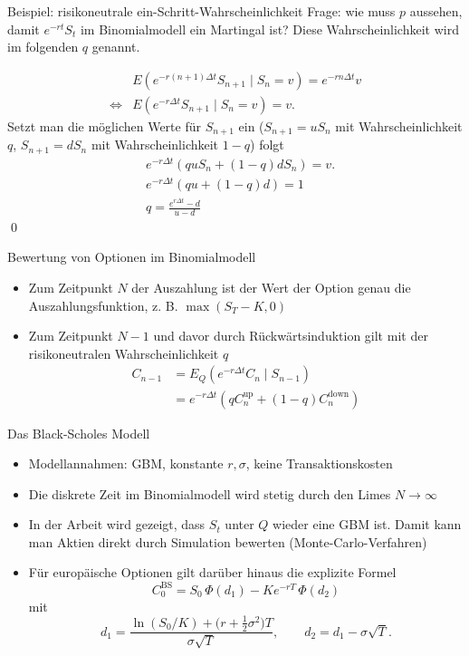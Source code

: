 \documentclass{beamer}
\begin{document}
\begin{frame}{Beispiel: risikoneutrale ein-Schritt-Wahrscheinlichkeit}
Frage: wie muss $p$ aussehen, damit $e^{-r t} S_t$ im Binomialmodell ein Martingal ist? Diese Wahrscheinlichkeit wird im folgenden $q$ genannt.

$$
\begin{aligned}
&E(e^{-r (n+1) \Delta t} S_{n+1} \mid S_n = v) = e^{-r n \Delta t} v
\\ 
\iff &E(e^{-r \Delta t} S_{n+1} \mid S_n=v) = v.
\end{aligned}
$$
Setzt man die möglichen Werte für $S_{n+1}$ ein ($S_{n+1} = u S_n$ mit Wahrscheinlichkeit $q$, $S_{n+1} = d S_n$ mit Wahrscheinlichkeit $1-q$) folgt
$$
\begin{aligned}
&e^{-r \Delta t} \left( q u S_n + (1-q) d S_n \right) = v.
\\
&e^{-r \Delta t} \left( q u + (1-q) d \right) = 1
\\
&q = \frac{e^{r \Delta t} - d}{u - d}
\end{aligned}
$$ \qed
\end{frame}

\begin{frame}{Bewertung von Optionen im Binomialmodell}
  \begin{itemize}
      \item Zum Zeitpunkt $N$ der Auszahlung ist der Wert der Option genau die Auszahlungsfunktion, z. B. $\max(S_T - K, 0)$
      \item Zum Zeitpunkt $N-1$ und davor durch Rückwärtsinduktion gilt mit der risikoneutralen Wahrscheinlichkeit $q$
      $$
      \begin{aligned}
C_{n-1} &= E_Q(e^{-r \Delta t} C_{n} \mid S_{n-1}) \\
&= e^{-r \Delta t} \left( q C_{n}^\text{up} + (1-q) C_{n}^\text{down} \right)
      \end{aligned}
      $$
  \end{itemize}
\end{frame}

\begin{frame}{Das Black-Scholes Modell}
  \begin{itemize}
      \item Modellannahmen: GBM, konstante $r,\sigma$, keine Transaktionskosten
      \item Die diskrete Zeit im Binomialmodell wird stetig durch den Limes $N \to \infty$
      \item In der Arbeit wird gezeigt, dass $S_t$ unter $Q$ wieder eine GBM ist. Damit kann man Aktien direkt durch Simulation bewerten (Monte-Carlo-Verfahren)
      \item Für europäische Optionen gilt darüber hinaus die explizite Formel
      $$C_0^{\mathrm{BS}}= S_0\,\Phi(d_1) - K e^{-rT}\,\Phi(d_2)$$ mit
      $$
d_1 = \frac{\ln(S_0/K) + \big(r + \tfrac12 \sigma^2\big)T}{\sigma \sqrt{T}},
\qquad
d_2 = d_1 - \sigma \sqrt{T}.
$$
  \end{itemize}
\end{frame}
\end{document}
